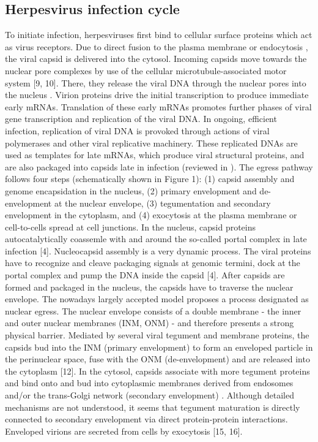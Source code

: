 \subsection{Herpesvirus infection cycle}
To initiate infection, herpesviruses first bind to cellular surface proteins which act as virus receptors.
Due to direct fusion to the plasma membrane or endocytosis \cite{[8]}, the viral capsid is delivered into the cytosol.
Incoming capsids move towards the nuclear pore complexes by use of the cellular microtubule-associated motor system [9, 10].
There, they release the viral DNA through the nuclear pores into the nucleus \cite{[11]}.
Virion proteins drive the initial transcription to produce immediate early mRNAs.
Translation of these early mRNAs promotes further phases of viral gene transcription and replication of the viral DNA.
In ongoing, efficient infection, replication of viral DNA is provoked through actions of viral polymerases and other viral replicative machinery.
These replicated DNAs are used as templates for late mRNAs, which produce viral structural proteins, and are also packaged into capsids late in infection (reviewed in \cite{[4]}).
The egress pathway follows four steps (schematically shown in Figure 1):
(1) capsid assembly and genome encapsidation in the nucleus,
(2) primary envelopment and de-envelopment at the nuclear envelope,
(3) tegumentation and secondary envelopment in the cytoplasm, and
(4) exocytosis at the plasma membrane or cell-to-cells spread at cell junctions.
In the nucleus, capsid proteins autocatalytically coassemle with and around the so-called portal complex in late infection [4].
Nucleocapsid assembly is a very dynamic process.
The viral proteins have to recognize and cleave packaging signals at genomic termini, dock at the portal complex and pump the DNA inside the capsid [4].
After capsids are formed and packaged in the nucleus, the capsids have to traverse the nuclear envelope.
The nowadays largely accepted model proposes a process designated as nuclear egress.
The nuclear envelope consists of a double membrane - the inner and outer nuclear membranes (INM, ONM) - and therefore presents a strong physical barrier.
Mediated by several viral tegument and membrane proteins, the capsids bud into the INM (primary envelopment) to form an enveloped particle in the perinuclear space, fuse with the ONM (de-envelopment) and are released into the cytoplasm [12].
In the cytosol, capsids associate with more tegument proteins and bind onto and bud into cytoplasmic membranes derived from endosomes and/or the trans-Golgi network (secondary envelopment) \cite{[13, 14]}.
Although detailed mechanisms are not understood, it seems that tegument maturation is directly connected to secondary envelopment via direct protein-protein interactions.
Enveloped virions are secreted from cells by exocytosis [15, 16].

